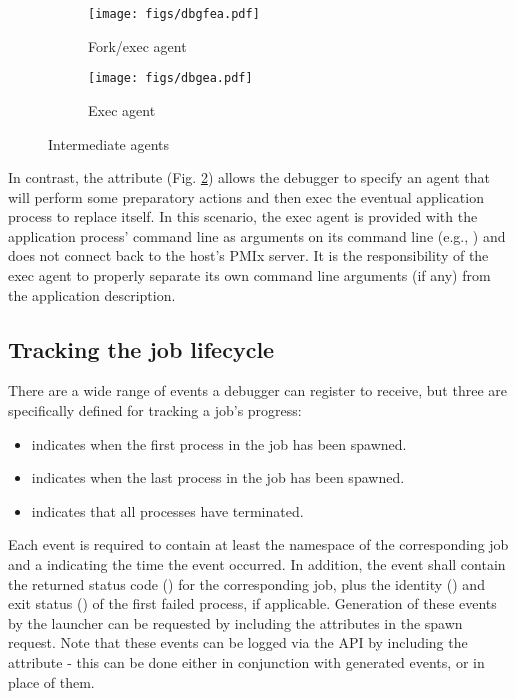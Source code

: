 \begin{figure*}[ht!]
\centering
\begin{subfigure}{.5\textwidth}
  \centering
  \texttt{[image: figs/dbgfea.pdf]}
  \caption{Fork/exec agent}
  \label{fig:dbgfea}
\end{subfigure}%
\begin{subfigure}{.5\textwidth}
  \centering
  \texttt{[image: figs/dbgea.pdf]}
  \caption{Exec agent}
  \label{fig:dbgea}
\end{subfigure}
\caption{Intermediate agents}
\label{fig:dbginta}
\end{figure*}

In contrast, the  attribute (Fig. \ref{fig:dbgea}) allows the debugger to specify an agent that will perform some preparatory actions and then exec the eventual application process to replace itself. In this scenario, the exec agent is provided with the application process' command line as arguments on its command line (e.g., ) and does not connect back to the host's \ac{PMIx} server. It is the responsibility of the exec agent to properly separate its own command line arguments (if any) from the application description.

\subsection{Tracking the job lifecycle}
\label{api:tools:trkjob}

There are a wide range of events a debugger can register to receive, but three
are specifically defined for tracking a job's progress:

\begin{itemize}
    \item {} indicates when the first process in
    the job has been spawned.
    \item {} indicates when the last process in
    the job has been spawned.
    \item {} indicates that all processes have
    terminated.
\end{itemize}

Each event is required to contain at least the namespace of the corresponding
job and a  indicating the time the event
occurred. In addition, the  event shall contain
the returned status code () for the
corresponding job, plus the identity () and exit status
() of the first failed process, if applicable.
Generation of these events by the launcher can be requested by including the
 attributes in the spawn request. Note that
these events can be logged via the  \ac{API} by
including the  attribute - this can be done either
in conjunction with generated events, or in place of them.


